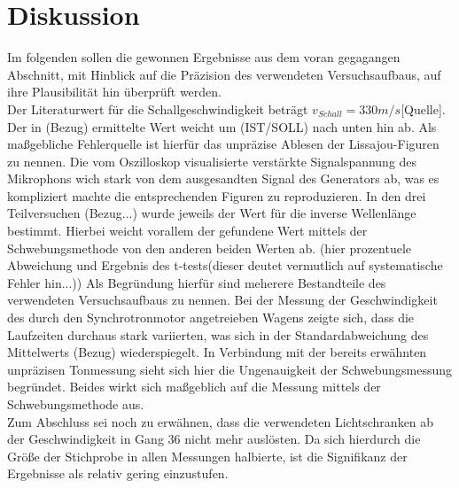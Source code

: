 \section{Diskussion}

Im folgenden sollen die gewonnen Ergebnisse aus dem voran gegagangen Abschnitt, mit Hinblick auf die Präzision
des verwendeten Versuchsaufbaus, auf ihre Plausibilität hin überprüft werden.  \\
Der Literaturwert für die Schallgeschwindigkeit beträgt $v_{Schall} = 330 m/s$[Quelle]. Der in (Bezug) ermittelte Wert weicht
um (IST/SOLL) nach unten hin ab. Als maßgebliche Fehlerquelle ist hierfür das unpräzise Ablesen der Lissajou-Figuren zu nennen. Die
vom Oszilloskop visualisierte verstärkte Signalspannung des Mikrophons wich stark von dem ausgesandten Signal des Generators ab, was es kompliziert
machte die entsprechenden Figuren zu reproduzieren.
In den drei Teilversuchen (Bezug...) wurde jeweils der Wert für die inverse Wellenlänge bestimmt. Hierbei weicht vorallem der gefundene
Wert mittels der Schwebungsmethode von den anderen beiden Werten ab. (hier prozentuele Abweichung
und Ergebnis des t-tests(dieser deutet vermutlich auf systematische Fehler hin...)) Als Begründung hierfür
sind meherere Bestandteile des verwendeten Versuchsaufbaus zu nennen.
Bei der Messung der Geschwindigkeit des durch den Synchrotronmotor angetreieben Wagens zeigte sich, dass die Laufzeiten
durchaus stark variierten, was sich in der Standardabweichung des Mittelwerts (Bezug) wiederspiegelt. In Verbindung mit der bereits erwähnten
unpräzisen Tonmessung sieht sich hier die Ungenauigkeit der Schwebungsmessung begründet. Beides wirkt sich maßgeblich auf die Messung mittels
der Schwebungsmethode aus. \\
Zum Abschluss sei noch zu erwähnen, dass die verwendeten Lichtschranken ab der Geschwindigkeit in Gang 36 nicht mehr auslösten. Da sich hierdurch
die Größe der Stichprobe in allen Messungen halbierte, ist die Signifikanz der Ergebnisse als relativ gering einzustufen.

